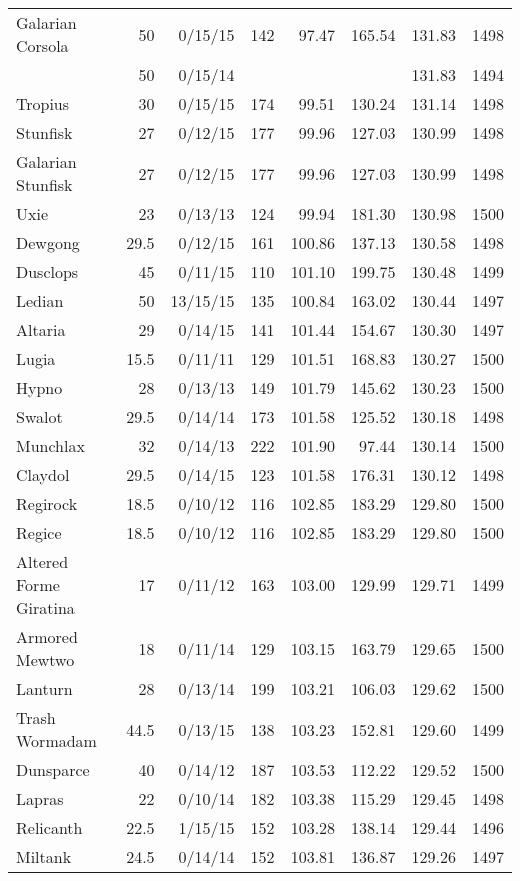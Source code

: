 \begin{longtable}{lrrrrrrr}
Galarian Corsola & 50 & 0/15/15 & 142 & 97.47 & 165.54 & 131.83 & 1498\\
 & 50 & 0/15/14 & & & & 131.83 & 1494\\
Tropius & 30 & 0/15/15 & 174 & 99.51 & 130.24 & 131.14 & 1498\\
Stunfisk & 27 & 0/12/15 & 177 & 99.96 & 127.03 & 130.99 & 1498\\
Galarian Stunfisk & 27 & 0/12/15 & 177 & 99.96 & 127.03 & 130.99 & 1498\\
Uxie & 23 & 0/13/13 & 124 & 99.94 & 181.30 & 130.98 & 1500\\
Dewgong & 29.5 & 0/12/15 & 161 & 100.86 & 137.13 & 130.58 & 1498\\
Dusclops & 45 & 0/11/15 & 110 & 101.10 & 199.75 & 130.48 & 1499\\
Ledian & 50 & 13/15/15 & 135 & 100.84 & 163.02 & 130.44 & 1497\\
Altaria & 29 & 0/14/15 & 141 & 101.44 & 154.67 & 130.30 & 1497\\
Lugia & 15.5 & 0/11/11 & 129 & 101.51 & 168.83 & 130.27 & 1500\\
Hypno & 28 & 0/13/13 & 149 & 101.79 & 145.62 & 130.23 & 1500\\
Swalot & 29.5 & 0/14/14 & 173 & 101.58 & 125.52 & 130.18 & 1498\\
Munchlax & 32 & 0/14/13 & 222 & 101.90 & 97.44 & 130.14 & 1500\\
Claydol & 29.5 & 0/14/15 & 123 & 101.58 & 176.31 & 130.12 & 1498\\
Regirock & 18.5 & 0/10/12 & 116 & 102.85 & 183.29 & 129.80 & 1500\\
Regice & 18.5 & 0/10/12 & 116 & 102.85 & 183.29 & 129.80 & 1500\\
Altered Forme Giratina & 17 & 0/11/12 & 163 & 103.00 & 129.99 & 129.71 & 1499\\
Armored Mewtwo & 18 & 0/11/14 & 129 & 103.15 & 163.79 & 129.65 & 1500\\
Lanturn & 28 & 0/13/14 & 199 & 103.21 & 106.03 & 129.62 & 1500\\
Trash Wormadam & 44.5 & 0/13/15 & 138 & 103.23 & 152.81 & 129.60 & 1499\\
Dunsparce & 40 & 0/14/12 & 187 & 103.53 & 112.22 & 129.52 & 1500\\
Lapras & 22 & 0/10/14 & 182 & 103.38 & 115.29 & 129.45 & 1498\\
Relicanth & 22.5 & 1/15/15 & 152 & 103.28 & 138.14 & 129.44 & 1496\\
Miltank & 24.5 & 0/14/14 & 152 & 103.81 & 136.87 & 129.26 & 1497\\

\end{longtable}
